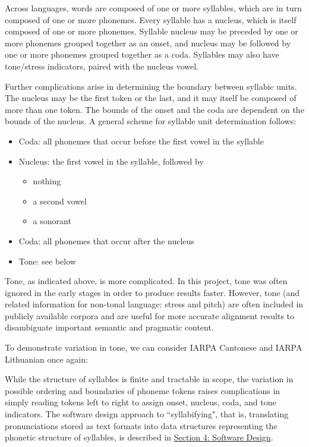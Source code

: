 \documentclass[11pt]{article}
\begin{document}
Across languages, words are composed of one or more syllables, which are in turn composed of one or more phonemes. Every syllable has a nucleus, which is itself composed of one or more phonemes. Syllable nucleus may be preceded by one or more phonemes grouped together as an onset, and nucleus may be followed by one or more phonemes grouped together as a coda. Syllables may also have tone/stress indicators, paired with the nucleus vowel.

Further complications arise in determining the boundary between syllabic units. The nucleus may be the first token or the last, and it may itself be composed of more than one token. The bounds of the onset and the coda are dependent on the bounds of the nucleus. A general scheme for syllable unit determination follows:

\begin{itemize}
  \item Coda: all phonemes that occur before the first vowel in the syllable
  \item Nucleus: the first vowel in the syllable, followed by\begin{itemize}\item nothing\item a second vowel \item a sonorant\end{itemize}
  \item Coda: all phonemes that occur after the nucleus
  \item Tone: see below
\end{itemize}

Tone, as indicated above, is more complicated. In this project, tone was often ignored in the early stages in order to produce results faster. However, tone (and related information for non-tonal language: stress and pitch) are often included in publicly available corpora and are useful for more accurate alignment results to disambiguate important semantic and pragmatic content.

To demonstrate variation in tone, we can consider IARPA Cantonese and IARPA Lithuanian once again:


While the structure of syllables is finite and tractable in scope, the variation in possible ordering and boundaries of phoneme tokens raises complications in simply reading tokens left to right to assign onset, nucleus, coda, and tone indicators. The software design approach to ``syllabifying", that is, translating pronunciations stored as text formats into data structures representing the phonetic structure of syllables, is described in \hyperlink{section.4}{Section 4: Software Design}.
\end{document}
